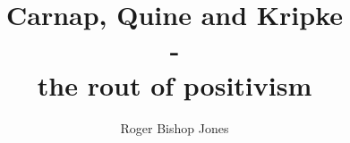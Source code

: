 \usepackage[T1]{fontenc}
\usepackage{textcomp}
\renewcommand{\rmdefault}{ppl}
\linespread{1.04}

\makeatletter
\def\cleardoublepage{\clearpage\if@twoside \ifodd\c@page\else
\hbox{}
\vspace*{\fill}
\begin{center}
\end{center}
\vspace{\fill}
\thispagestyle{empty}
\newpage
\if@twocolumn\hbox{}\newpage\fi\fi\fi}
\makeatother

\usepackage{fancyhdr}
\pagestyle{fancyplain}

\usepackage[twoside,paperwidth=5in,paperheight=8in,hmargin={0.5in,0.25in},vmargin={0.25in,0.25in},includehead,includefoot]{geometry}
\usepackage{tocloft}
\usepackage{tocbibind}
\makeindex
\newcommand{\indexentry}[2]{\item #1 #2}
\newcommand{\ignore}[1]{}

\fancyhfoffset[EL,RO]{0pt}
\newcommand{\aref}{}
\newcommand{\bookname}{}
\renewcommand{\chaptermark}[1]{\markboth{#1}{}}
\renewcommand{\sectionmark}[1]{\markright{#1}}
\lhead[\fancyplain{}{\thepage}]         {\fancyplain{}{}}
\chead[\fancyplain{}{\slshape\leftmark}]                 {\fancyplain{}{\slshape\rightmark}}
\rhead[\fancyplain{}{}]       {\fancyplain{}{\thepage}}
\lfoot[\fancyplain{}{\aref}]            {\fancyplain{}{}}
\cfoot[\fancyplain{}{}]                 {\fancyplain{}{}}
\rfoot[\fancyplain{}{}]                 {\fancyplain{}{\aref}}

\renewcommand{\headrulewidth}{0pt}

\title{Carnap, Quine and Kripke\\ \Large - \\ the rout of positivism}
\author{Roger Bishop Jones}
\date{\ }


\frontmatter

